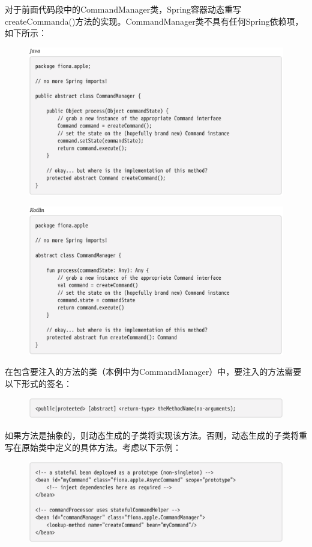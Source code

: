 对于前面代码段中的CommandManager类，Spring容器动态重写createCommanda()方法的实现。CommandManager类不具有任何Spring依赖项，如下所示：

\begin{figure}[ht]
    \centering
    \includegraphics[width=1\linewidth]{./Figure/61.png}
\end{figure}
\begin{figure}[ht]
    \centering
    \includegraphics[width=1\linewidth]{./Figure/62.png}
\end{figure}

\newpage
在包含要注入的方法的类（本例中为CommandManager）中，要注入的方法需要以下形式的签名：

\begin{figure}[ht]
    \centering
    \includegraphics[width=1\linewidth]{./Figure/63.png}
\end{figure}

如果方法是抽象的，则动态生成的子类将实现该方法。否则，动态生成的子类将重写在原始类中定义的具体方法。考虑以下示例：
\begin{figure}[ht]
    \centering
    \includegraphics[width=1\linewidth]{./Figure/64.png}
\end{figure}

